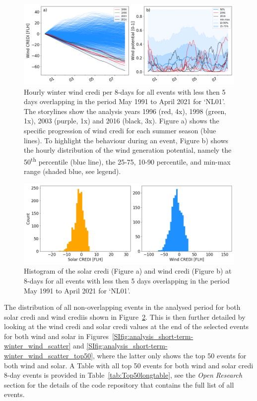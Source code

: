 \documentclass[a4paper,11pt]{extarticle}
\newcommand{\ts}[1]{\textsuperscript{#1}}
\newcommand{\sdi}[0]{{\sc solar credi}}
\newcommand{\wdi}[0]{{\sc wind credi}}
\begin{document}
\begin{figure}[h]
        \centering
        \includegraphics[width=\textwidth]{WindCREDI_shortterm_behaviour}
        \caption{
                Hourly winter \wdi{} per 8-days for all events with less then 5 days overlapping in the period May 1991 to April 2021 for `NL01'. 
                The storylines show the analysis years 1996 (red, 4x), 1998 (green, 1x), 2003 (purple, 1x) and 2016 (black, 3x). 
                Figure a) shows the specific progression of \wdi{} for each summer season (blue lines). 
                To highlight the behaviour during an event, Figure b) shows the hourly distribution of the wind generation potential, namely the 50\ts{th} percentile (blue line), the 25-75, 10-90 percentile, and min-max range (shaded blue, see legend).
        }
        \label{SIfig:analysis_short-term-winter_wind_behaviour}
\end{figure}

\begin{figure}[h]
        \centering
        \includegraphics[width=\textwidth]{CREDI_shortterm_histogram}
        \caption{
                Histogram of the \sdi{} (Figure a) and \wdi{} (Figure b) at 8-days for all events with less then 5 days overlapping in the period May 1991 to April 2021 for `NL01'. 
        }
        \label{SIfig:analysis_short-term-winter_wind_histogram}
\end{figure}

The distribution of all non-overlapping events in the analysed period for both \sdi{} and \wdi is shown in Figure~\ref{SIfig:analysis_short-term-winter_wind_histogram}.
This is then further detailed by looking at the \wdi{} and \sdi{} values at the end of the selected events for both wind and solar in Figures~\ref{SIfig:analysis_short-term-winter_wind_scatter} and \ref{SIfig:analysis_short-term-winter_wind_scatter_top50}, where the latter only shows the top 50 events for both wind and solar.
A Table with all top 50 events for both {\sc wind} and \sdi{} 8-day events is provided in Table~\ref{tab:Top50longtable}, see the \emph{Open Research} section for the details of the code repository that contains the full list of all events.
\end{document}
